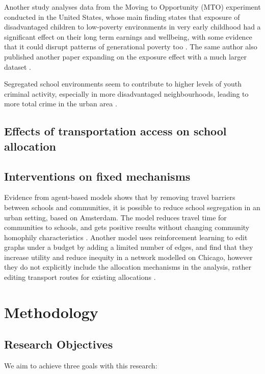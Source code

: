\documentclass{article}
\begin{document}
\begin{multicols}{2}
Another study analyses data from the Moving to Opportunity (MTO) experiment conducted in the United States, whose main finding states that exposure of disadvantaged children to low-poverty environments in very early childhood had a significant effect on their long term earnings and wellbeing, with some evidence that it could disrupt patterns of generational poverty too \cite{chettyEffectsExposureBetter2016}. The same author also published another paper expanding on the exposure effect with a much larger dataset \cite{chettyImpactsNeighborhoodsIntergenerational2018}.

Segregated school environments seem to contribute to higher levels of youth criminal activity, especially in more disadvantaged neighbourhoods, leading to more total crime in the urban area \cite{billingsPartnersCrime2019}.

\subsection{Effects of transportation access on school allocation}

\subsection{Interventions on fixed mechanisms}
Evidence from agent-based models shows that by removing travel barriers between schools and communities, it is possible to reduce school segregation in an urban setting, based on Amsterdam. The model reduces travel time for communities to schools, and gets positive results without changing community homophily characteristics \cite{michailidisTacklingSchoolSegregation2024}. Another model uses reinforcement learning to edit graphs under a budget by adding a limited number of edges, and find that they increase utility and reduce inequity in a network modelled on Chicago, however they do not explicitly include the allocation mechanisms in the analysis, rather editing transport routes for existing allocations \cite{ramachandranGAEAGraphAugmentation2021}.

\section{Methodology}
\subsection{Research Objectives}
We aim to achieve three goals with this research:


\end{multicols}
\end{document}
